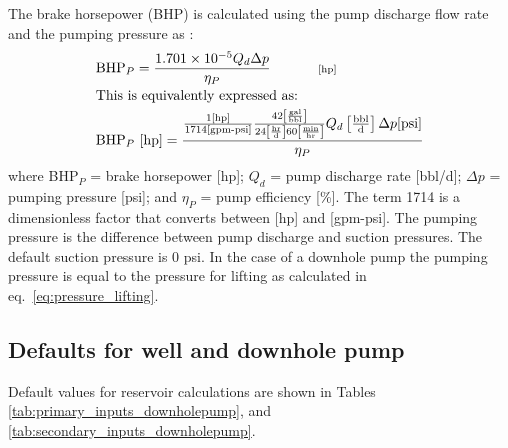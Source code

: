 \documentclass[11pt]{report}
\newcommand{\eqnunit}[1]{\quad\quad \scriptstyle{\left[\text{#1}\right]}}
\begin{document}
The brake horsepower (BHP) is calculated using the pump discharge flow rate and the pumping pressure as \cite[p. 27]{Rose1989}: 
\begin{equation} \label{eq:pump_BHP}
\begin{split}
&\text{BHP$_{P}$}=\frac{1.701 \times 10^{-5} Q_{d} \Delta p}{\eta_P} \begin{footnotesize} \quad\quad\eqnunit{hp} \end{footnotesize}\\
&\text{This is equivalently expressed as:}\\
&\text{BHP$_{P}$ [hp]}=\frac{\frac{1 [\text{hp}]}{1714 [\text{gpm-psi}]} \frac{42\left[\frac{\text{gal}}{\text{bbl}}\right]}{24\left[\frac{\text{hr}}{\text{d}}\right] 60\left[\frac{\text{min}}{\text{hr}}\right]} Q_{d} \left[\frac{\text{bbl}}{\text{d}}\right] \Delta p [\text{psi}]}{\eta_P} 
\end{split}
\end{equation}
where BHP$_{P}$ = brake horsepower [hp]; $Q_{d}$ = pump discharge rate [bbl/d]; \newline $\Delta p$ = pumping pressure [psi]; and $\eta_P$ = pump efficiency [\%]. The term 1714 is a dimensionless factor that converts between [hp] and [gpm-psi]. The pumping pressure is the difference between pump discharge and suction pressures. The default suction pressure is 0 psi. In the case of a downhole pump the pumping pressure is equal to the pressure for lifting as calculated in eq.\ \eqref{eq:pressure_lifting}. 

\subsection{Defaults for well and downhole pump}

Default values for reservoir calculations are shown in Tables \ref{tab:primary_inputs_downholepump}, and \ref{tab:secondary_inputs_downholepump}. 
\end{document}
